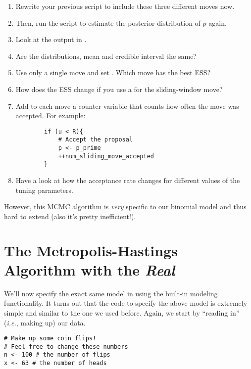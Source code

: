 \begin{enumerate}[label=\textnormal{Step \arabic*)}]
	\item Rewrite your previous script to include these three different moves now.
	\item Then, run the script to estimate the posterior distribution of $p$ again.
	\item Look at the output in \Tracer.
	\item Are the distributions, mean and credible interval the same?
	\item Use only a single move and set . Which move has the best ESS?
	\item How does the ESS change if you use a  for the sliding-window move?
	\item Add to each move a counter variable that counts how often the move was accepted. For example:
{\tt \begin{snugshade*}
\begin{lstlisting}    
        if (u < R){
            # Accept the proposal
            p <- p_prime
            ++num_sliding_move_accepted
        } \end{lstlisting}
\end{snugshade*}}
	\item Have a look at how the acceptance rate changes for different values of the tuning parameters.
\end{enumerate}


However, this MCMC algorithm is \emph{very} specific to our binomial model and thus hard to extend (also it's pretty inefficient!).


\section{The Metropolis-Hastings Algorithm with the \emph{Real} \RevBayes}
We'll now specify the exact same model in \Rev using the built-in modeling functionality.
It turns out that the \Rev code to specify the above model is extremely simple and similar to the one we used before.
Again, we start by ``reading in'' (\emph{i.e.}, making up) our data.

{\tt \begin{snugshade*}
\begin{lstlisting}    
# Make up some coin flips!
# Feel free to change these numbers
n <- 100 # the number of flips
x <- 63	# the number of heads
\end{lstlisting}
\end{snugshade*}}

